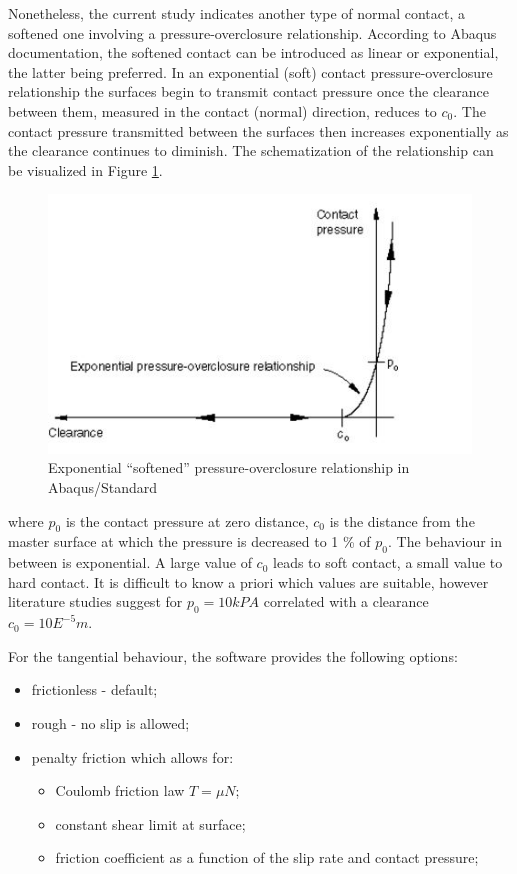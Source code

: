 Nonetheless, the current study indicates another type of normal contact, a softened one involving a pressure-overclosure relationship. According to Abaqus documentation, the softened contact can be introduced as linear or exponential, the latter being preferred. In an exponential (soft) contact pressure-overclosure relationship the surfaces begin to transmit contact pressure once the clearance between them, measured in the contact (normal) direction, reduces to $c_0$. The contact pressure transmitted between the surfaces then increases exponentially as the clearance continues to diminish. The schematization of the relationship can be visualized in Figure \ref{pressure}.
\begin{figure}[!h]
	\centering
	\includegraphics[width=0.45 \linewidth]{"pressure"}
	\caption{Exponential “softened” pressure-overclosure relationship in Abaqus/Standard}
	\label{pressure}
\end{figure} 

where $p_0$ is the contact pressure at zero distance, $ c_0$ is the distance from the master surface at which the pressure is decreased to 1 \% of $ p_0$. The behaviour in between is exponential. A large value of $ c_0$ leads to soft contact, a small value to hard contact. It is difficult to know a priori which values are suitable, however literature studies suggest for $p_0=10 kPA$ correlated with a clearance $c_0=10E^{-5} m$.


For the tangential behaviour, the software provides the following options:
\begin{itemize}
	\item frictionless - default;
	\item rough - no slip is allowed;
	\item penalty friction which allows for:
		\begin{itemize}
			\item Coulomb friction law $T=\mu N$;
			\item constant shear limit at surface;
			\item friction coefficient as a function of the slip rate and contact pressure;
		\end{itemize}
\end{itemize}

